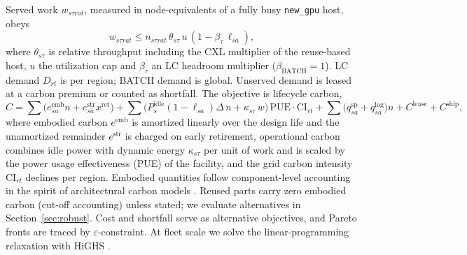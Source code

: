 \documentclass[11pt]{article}
\begin{document}
Served work $w_{s\tau rat}$, measured in node-equivalents of a fully busy \texttt{new\_gpu} host, obeys
\begin{equation}
w_{s\tau rat}\le n_{s\tau rat}\,\theta_{s\tau}\,u\,(1-\beta_\tau\,\ell_{sa}),
\label{eq:cap}
\end{equation}
where $\theta_{s\tau}$ is relative throughput including the CXL multiplier of the reuse-based host, $u$ the utilization cap and $\beta_\tau$ an LC headroom multiplier ($\beta_{\text{BATCH}}=1$). LC demand $D_{rt}$ is per region; BATCH demand is global. Unserved demand is leased at a carbon premium or counted as shortfall. The objective is lifecycle carbon,
\begin{equation}
C=\sum\Big(e^{\text{emb}}_{sa}n + e^{\text{str}}_{sa}x^{\text{ret}}\Big)+\sum\Big(P^{\text{idle}}_{s}(1-\ell_{sa})\Delta\,n+\kappa_{s\tau}\,w\Big)\,\mathrm{PUE}\cdot\mathrm{CI}_{rt}+\sum\big(q^{\text{sp}}_{sa}+q^{\text{log}}_{sa}\big)n+C^{\text{lease}}+C^{\text{ship}},
\label{eq:obj}
\end{equation}
where embodied carbon $e^{\text{emb}}$ is amortized linearly over the design life and the unamortized remainder $e^{\text{str}}$ is charged on early retirement, operational carbon combines idle power with dynamic energy $\kappa_{s\tau}$ per unit of work and is scaled by the power usage effectiveness (PUE) of the facility, and the grid carbon intensity $\mathrm{CI}_{rt}$ declines per region. Embodied quantities follow component-level accounting in the spirit of architectural carbon models \citep{gupta2022act}. Reused parts carry zero embodied carbon (cut-off accounting) unless stated; we evaluate alternatives in Section~\ref{sec:robust}. Cost and shortfall serve as alternative objectives, and Pareto fronts are traced by $\varepsilon$-constraint. At fleet scale we solve the linear-programming relaxation with HiGHS \citep{huangfu2018highs}.
\end{document}
